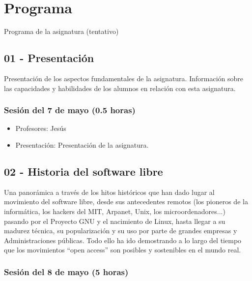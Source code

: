 \documentclass[a4paper,12pt]{article}
\begin{document}
\section{Programa}

Programa de la asignatura (tentativo)

\subsection{01 - Presentación}

Presentación de los aspectos fundamentales de la asignatura. Información sobre las capacidades y habilidades de los alumnos en relación con esta asignatura.

\subsubsection{Sesión del 7 de mayo (0.5 horas)}

\begin{itemize}
\item Profesores: Jesús
\item Presentación: Presentación de la asignatura.
\end{itemize}

\subsection{02 - Historia del software libre}

Una panorámica a través de los hitos históricos que han dado lugar al movimiento del software libre, desde sus antecedentes remotos (los pioneros de la informática, los hackers del MIT, Arpanet, Unix, los microordenadores...) pasando por el Proyecto GNU y el nacimiento de Linux, hasta llegar a su madurez técnica, su popularización y su uso por parte de grandes empresas y Administraciones públicas. Todo ello ha ido demostrando a lo largo del tiempo que los movimientos ``open access'' son posibles y sostenibles en el mundo real. 

\subsubsection{Sesión del 8 de mayo (5 horas)}
\end{document}
